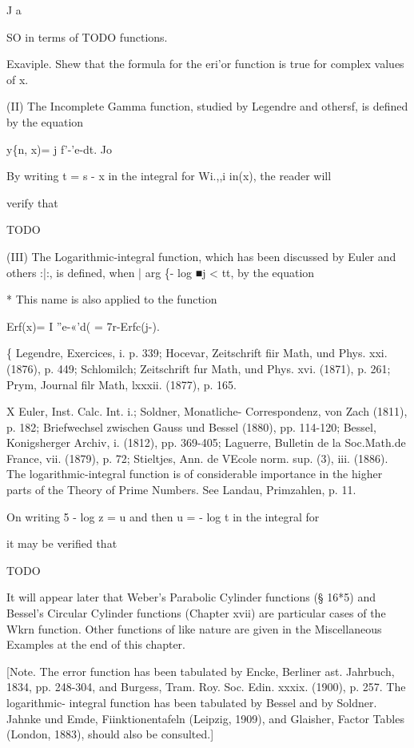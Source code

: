 J a

SO in terms of TODO functions.

Exaviple. Shew that the formula for the eri'or function is true for
complex values of x.

(II) The Incomplete Gamma function, studied by Legendre and othersf,
is defined by the equation

y\{n, x)= j f'-'e-dt. Jo

By writing t = s - x in the integral for Wi.,,i in(x), the reader
will

verify that

TODO

(III) The Logarithmic-integral function, which has been discussed by
Euler and others :|:, is defined, when | arg \{- log ■j < tt, by the
equation

* This name is also applied to the function

Erf(x)= I ''e-«'d( = 7r-Erfc(j-).

\{ Legendre, Exercices, i. p. 339; Hocevar, Zeitschrift fiir Math,
und Phys. xxi. (1876), p. 449; Schlomilch; Zeitschrift fur Math, und
Phys. xvi. (1871), p. 261; Prym, Journal filr Math, lxxxii. (1877),
p. 165.

X Euler, Inst. Calc. Int. i.; Soldner, Monatliche- Correspondenz, von
Zach (1811), p. 182; Briefwechsel zwischen Gauss und Bessel (1880),
pp. 114-120; Bessel, Konigsherger Archiv, i. (1812), pp. 369-405;
Laguerre, Bulletin de la Soc.Math.de France, vii. (1879), p. 72;
Stieltjes, Ann. de VEcole norm. sup. (3), iii. (1886). The
logarithmic-integral function is of considerable importance in the
higher parts of the Theory of Prime Numbers. See Landau, Primzahlen,
p. 11.

%
%

On writing 5 - log z = u and then u = - log t in the integral for

it may be verified that

TODO

It will appear later that Weber's Parabolic Cylinder functions (§
16*5) and Bessel's Circular Cylinder functions (Chapter xvii) are
particular cases of the Wkrn function. Other functions of like
nature are given in the Miscellaneous Examples at the end of this
chapter.

[Note. The error function has been tabulated by Encke, Berliner ast.
Jahrbuch, 1834, pp. 248-304, and Burgess, Tram. Roy. Soc. Edin. xxxix.
(1900), p. 257. The logarithmic- integral function has been tabulated
by Bessel and by Soldner. Jahnke und Emde, Fiinktionentafeln (Leipzig,
1909), and Glaisher, Factor Tables (London, 1883), should also be
consulted.]

